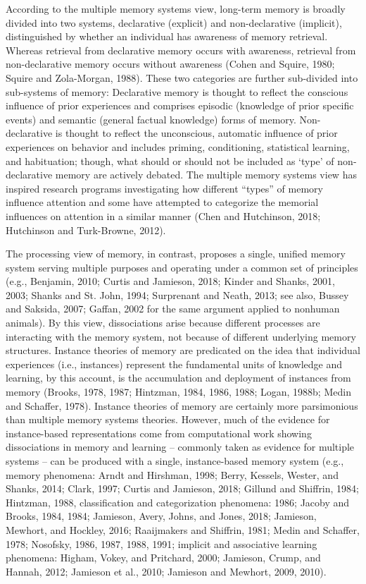 \documentclass[]{DissertateCUNY}
\begin{document}
According to the multiple memory systems view, long-term memory is
broadly divided into two systems, declarative (explicit) and
non-declarative (implicit), distinguished by whether an individual has
awareness of memory retrieval. Whereas retrieval from declarative memory
occurs with awareness, retrieval from non-declarative memory occurs
without awareness (Cohen and Squire, 1980; Squire and Zola-Morgan,
1988). These two categories are further sub-divided into sub-systems of
memory: Declarative memory is thought to reflect the conscious influence
of prior experiences and comprises episodic (knowledge of prior specific
events) and semantic (general factual knowledge) forms of memory.
Non-declarative is thought to reflect the unconscious, automatic
influence of prior experiences on behavior and includes priming,
conditioning, statistical learning, and habituation; though, what should
or should not be included as `type' of non-declarative memory are
actively debated. The multiple memory systems view has inspired research
programs investigating how different ``types'' of memory influence
attention and some have attempted to categorize the memorial influences
on attention in a similar manner (Chen and Hutchinson, 2018; Hutchinson
and Turk-Browne, 2012).

The processing view of memory, in contrast, proposes a single, unified
memory system serving multiple purposes and operating under a common set
of principles (e.g., Benjamin, 2010; Curtis and Jamieson, 2018; Kinder
and Shanks, 2001, 2003; Shanks and St. John, 1994; Surprenant and Neath,
2013; see also, Bussey and Saksida, 2007; Gaffan, 2002 for the same
argument applied to nonhuman animals). By this view, dissociations arise
because different processes are interacting with the memory system, not
because of different underlying memory structures. Instance theories of
memory are predicated on the idea that individual experiences (i.e.,
instances) represent the fundamental units of knowledge and learning, by
this account, is the accumulation and deployment of instances from
memory (Brooks, 1978, 1987; Hintzman, 1984, 1986, 1988; Logan, 1988b;
Medin and Schaffer, 1978). Instance theories of memory are certainly
more parsimonious than multiple memory systems theories. However, much
of the evidence for instance-based representations come from
computational work showing dissociations in memory and learning --
commonly taken as evidence for multiple systems -- can be produced with
a single, instance-based memory system (e.g., memory phenomena: Arndt
and Hirshman, 1998; Berry, Kessels, Wester, and Shanks, 2014; Clark,
1997; Curtis and Jamieson, 2018; Gillund and Shiffrin, 1984; Hintzman,
1988, classification and categorization phenomena: 1986; Jacoby and
Brooks, 1984, 1984; Jamieson, Avery, Johns, and Jones, 2018; Jamieson,
Mewhort, and Hockley, 2016; Raaijmakers and Shiffrin, 1981; Medin and
Schaffer, 1978; Nosofsky, 1986, 1987, 1988, 1991; implicit and
associative learning phenomena: Higham, Vokey, and Pritchard, 2000;
Jamieson, Crump, and Hannah, 2012; Jamieson et al., 2010; Jamieson and
Mewhort, 2009, 2010).
\end{document}
